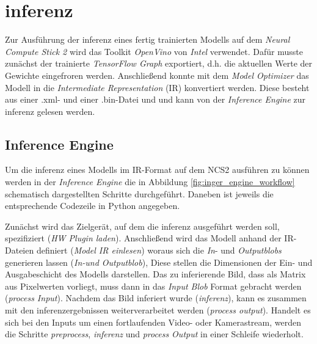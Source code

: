 \section{\Gls{inferenz}}\label{sec:inferenz}

Zur Ausführung der \Gls{inferenz} eines fertig trainierten 
Modells auf dem \textit{Neural Compute Stick 2} 
wird das Toolkit \textit{OpenVino} von \textit{Intel} verwendet.
Dafür musste zunächst der trainierte \textit{TensorFlow Graph} 
exportiert, d.h. die aktuellen Werte der Gewichte 
eingefroren werden.
Anschließend konnte mit dem \textit{Model Optimizer}
das Modell in die \textit{Intermediate Representation} (IR)
konvertiert werden.
Diese besteht aus einer .xml- und einer .bin-Datei und 
und kann von der \textit{Inference Engine}
zur \Gls{inferenz} gelesen werden.


\subsection*{Inference Engine}

Um die \Gls{inferenz} eines Modells im IR-Format 
auf dem NCS2 ausführen zu können werden 
in der \textit{Inference Engine} die in Abbildung 
\ref{fig:inger_engine_workflow} schematisch
dargestellten Schritte durchgeführt.
Daneben ist jeweils die entsprechende 
Codezeile in Python angegeben.

Zunächst wird das Zielgerät, auf dem 
die \Gls{inferenz} ausgeführt werden soll,
spezifiziert (\textit{HW Plugin laden}).
Anschließend wird das Modell anhand der 
IR-Dateien definiert (\textit{Model IR einlesen})
woraus sich die \textit{In}- und \textit{Outputblobs}
 generieren lassen (\textit{In-und Outputblob}), 
Diese stellen die Dimensionen der Ein- und Ausgabeschicht
des Modells darstellen.
Das zu inferierende Bild,
dass als Matrix aus Pixelwerten 
vorliegt, muss dann in das \textit{Input Blob}
Format gebracht werden (\textit{process Input}).
Nachdem das Bild inferiert wurde (\textit{\Gls{inferenz}}),
kann es zusammen mit den \Gls{inferenz}ergebnissen 
weiterverarbeitet werden (\textit{process
output}).
Handelt es sich bei den Inputs 
um einen fortlaufenden Video- oder 
Kamerastream, werden die Schritte 
\textit{preprocess}, \textit{\Gls{inferenz}} und 
\textit{process Output} in einer Schleife wiederholt.


